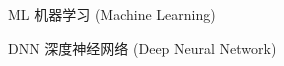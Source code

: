 \begin{denotation}[3cm]
\item[ML] 机器学习 (Machine Learning)
\item[DNN] 深度神经网络 (Deep Neural Network)
\end{denotation}
